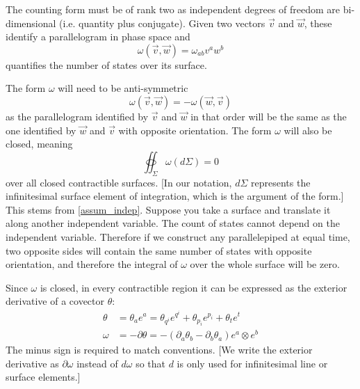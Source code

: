 \documentclass[fleqn,10pt]{wlscirep}
\begin{document}
The counting form must be of rank two as independent degrees of freedom are bi-dimensional (i.e. quantity plus conjugate). Given two vectors $\vec{v}$ and $\vec{w}$, these identify a parallelogram in phase space and 
\begin{equation}\label{mdof_form_applied}
	\omega(\vec{v}, \vec{w}) = \omega_{ab} v^a w^b
\end{equation}
quantifies the number of states over its surface.

The form $\omega$ will need to be anti-symmetric
\begin{equation}\label{mdof_form_antisymm}
	\omega(\vec{v}, \vec{w}) = - \omega(\vec{w}, \vec{v})
\end{equation}
as the parallelogram identified by $\vec{v}$ and $\vec{w}$ in that order will be the same as the one identified by $\vec{w}$ and $\vec{v}$ with opposite orientation. The form $\omega$ will also be closed, meaning 
\begin{equation}\label{mdof_closed_form}
	\oiint_\Sigma \omega(d\Sigma) = 0
\end{equation}
over all closed contractible surfaces. [In our notation, $d\Sigma$ represents the infinitesimal surface element of integration, which is the argument of the form.] This stems from \ref{assum_indep}. Suppose you take a surface and translate it along another independent variable. The count of states cannot depend on the independent variable. Therefore if we construct any parallelepiped at equal time, two opposite sides will contain the same number of states with opposite orientation, and therefore the integral of $\omega$ over the whole surface will be zero.

Since $\omega$ is closed, in every contractible region it can be expressed as the exterior derivative of a covector $\theta$:
\begin{equation}\label{mdof_form_potential}
	\begin{aligned}
		\theta &= \theta_a e^a = \theta_{q^i} e^{q^i} + \theta_{p_i} e^{p_i} + \theta_t e^t \\
		\omega &= - \partial \theta = - \left( \partial_a \theta_b - \partial_b \theta_a \right) e^a \otimes e^b
	\end{aligned}
\end{equation}
The minus sign is required to match conventions. [We write the exterior derivative as $\partial \omega$ instead of $d \omega$ so that $d$ is only used for infinitesimal line or surface elements.] 
\end{document}

